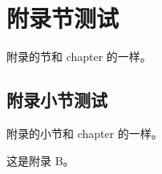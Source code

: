 

\section{附录节测试}

附录的节和 chapter 的一样。

\subsection{附录小节测试}

附录的小节和 chapter 的一样。

\appendix{}

这是附录 B。
